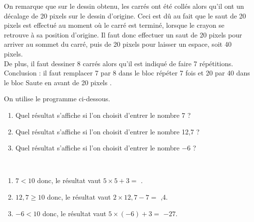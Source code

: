 \begin{corrige}
   On remarque que sur le dessin obtenu, les carrés ont été collés alors qu'il ont un décalage de 20 pixels sur le dessin d'origine. Ceci est dû au fait que le saut de 20 pixels est effectué au moment où le carré est terminé, lorsque le crayon se retrouve à sa position d'origine. Il faut donc effectuer un saut de 20 pixels pour arriver au sommet du carré, puis de 20 pixels pour laisser un espace, soit 40 pixels. \\
   De plus, il faut dessiner 8 carrés alors qu'il est indiqué de faire 7 répétitions. \\
   Conclusion : {\blue il faut remplacer 7 par 8 dans le bloc \og répéter 7 fois \fg{} et 20 par 40 dans le bloc \og Saute en avant de 20 pixels \fg}. \\
\end{corrige}

\bigskip



\begin{exercice}[CRPE 2017 G1]
   On utilise le programme ci-dessous.
   \begin{enumerate}
      \item Quel résultat s’affiche si l’on choisit d’entrer le nombre 7 ?
      \item Quel résultat s’affiche si l’on choisit d’entrer le nombre 12,7 ?
      \item Quel résultat s’affiche si l’on choisit d’entrer le nombre $-6$ ?
   \end{enumerate}
   \begin{center}
      \begin{scratch}    
            {}
            {}
      \end{scratch}
   \end{center}
\end{exercice}

\begin{corrige}
\ \\ [-5mm]
   \begin{enumerate}
      \item $7<10$ donc, le résultat vaut $5\times5+3 =$ {}.
      \item $12,7\geq10$ donc, le résultat vaut $2\times12,7-7 =$ {,4}.
      \item $-6<10$ donc, le résultat vaut $5\times(-6)+3=$ {\blue $-27$}.
   \end{enumerate}
\end{corrige}


